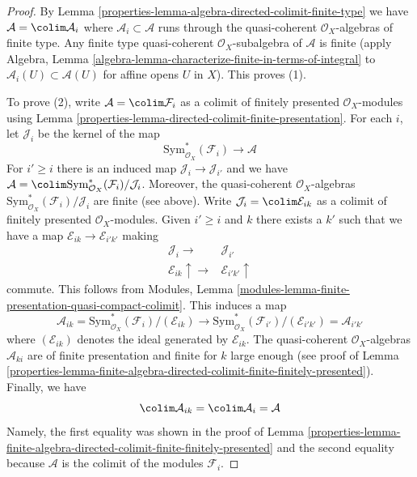\begin{proof}

By Lemma \ref{properties-lemma-algebra-directed-colimit-finite-type} we have
$\mathcal{A} = \colim \mathcal{A}_i$ where
$\mathcal{A}_i \subset \mathcal{A}$ runs through the
quasi-coherent $\mathcal{O}_X$-algebras of finite type.
Any finite type quasi-coherent $\mathcal{O}_X$-subalgebra
of $\mathcal{A}$ is finite (apply Algebra, Lemma
\ref{algebra-lemma-characterize-finite-in-terms-of-integral}
to $\mathcal{A}_i(U) \subset \mathcal{A}(U)$ for affine opens $U$
in $X$). This proves (1).

\medskip\noindent
To prove (2), write $\mathcal{A} = \colim \mathcal{F}_i$
as a colimit of finitely presented $\mathcal{O}_X$-modules using
Lemma \ref{properties-lemma-directed-colimit-finite-presentation}.
For each $i$, let $\mathcal{J}_i$ be the kernel of the map
$$
\text{Sym}^*_{\mathcal{O}_X}(\mathcal{F}_i) \longrightarrow \mathcal{A}
$$
For $i' \geq i$ there is an induced map $\mathcal{J}_i \to \mathcal{J}_{i'}$
and we have $\mathcal{A} =
\colim \text{Sym}^*_{\mathcal{O}_X}(\mathcal{F}_i)/\mathcal{J}_i$.
Moreover, the quasi-coherent $\mathcal{O}_X$-algebras
$\text{Sym}^*_{\mathcal{O}_X}(\mathcal{F}_i)/\mathcal{J}_i$
are finite (see above). Write $\mathcal{J}_i = \colim \mathcal{E}_{ik}$
as a colimit of finitely presented $\mathcal{O}_X$-modules.
Given $i' \geq i$ and $k$ there exists a $k'$ such that we
have a map $\mathcal{E}_{ik} \to \mathcal{E}_{i'k'}$
making
$$
\begin{array}{cc}\mathcal{J}_i \longrightarrow & \mathcal{J}_{i'} \\ \mathcal{E}_{ik} \uparrow\longrightarrow & \mathcal{E}_{i'k'} \uparrow\end{array}
$$
commute. This follows from
Modules, Lemma \ref{modules-lemma-finite-presentation-quasi-compact-colimit}.
This induces a map
$$
\mathcal{A}_{ik} =
\text{Sym}^*_{\mathcal{O}_X}(\mathcal{F}_i)/(\mathcal{E}_{ik})
\longrightarrow
\text{Sym}^*_{\mathcal{O}_X}(\mathcal{F}_{i'})/(\mathcal{E}_{i'k'}) =
\mathcal{A}_{i'k'}
$$
where $(\mathcal{E}_{ik})$ denotes the ideal generated by $\mathcal{E}_{ik}$.
The quasi-coherent $\mathcal{O}_X$-algebras $\mathcal{A}_{ki}$
are of finite presentation and finite for $k$ large enough
(see proof of
Lemma \ref{properties-lemma-finite-algebra-directed-colimit-finite-finitely-presented}).
Finally, we have
$$
\colim \mathcal{A}_{ik} = \colim \mathcal{A}_i = \mathcal{A}
$$
Namely, the first equality was shown in the proof of
Lemma \ref{properties-lemma-finite-algebra-directed-colimit-finite-finitely-presented}
and the second equality because $\mathcal{A}$ is the colimit of
the modules $\mathcal{F}_i$.
\end{proof}

